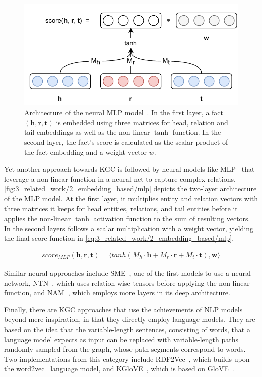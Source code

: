 \begin{figure}[t]
    \centering
    \includegraphics{3_related_work/2_embedding_based/mlp}
    \caption{Architecture of the neural MLP model~\cite{Dong2014KnowledgeVA}. In the first layer, a fact $(\textbf{h}, \textbf{r}, \textbf{t})$ is embedded using three matrices for head, relation and tail embeddings as well as the non-linear $\tanh$ function. In the second layer, the fact's score is calculated as the scalar product of the fact embedding and a weight vector $w$.}
    \label{fig:3_related_work/2_embedding_based/mlp}
\end{figure}

Yet another approach towards KGC is followed by neural models like MLP~\cite{Dong2014KnowledgeVA} that leverage a non-linear function in a neural net to capture complex relations. \autoref{fig:3_related_work/2_embedding_based/mlp} depicts the two-layer architecture of the MLP model. At the first layer, it multiplies entity and relation vectors with three matrices it keeps for head entities, relations, and tail entities before it applies the non-linear $\tanh$ activation function to the sum of resulting vectors. In the second layers follows a scalar multiplication with a weight vector, yielding the final score function in \autoref{eq:3_related_work/2_embedding_based/mlp}.

\begin{align}
    score_{MLP}(\textbf{h}, \textbf{r}, \textbf{t}) = \langle tanh(M_h \cdot \textbf{h} + M_r \cdot \textbf{r} + M_t \cdot \textbf{t}), \textbf{w} \rangle
    \label{eq:3_related_work/2_embedding_based/mlp}
\end{align}

Similar neural approaches include SME~\cite{Glorot2013ASM}, one of the first models to use a neural network, NTN~\cite{Socher2013ReasoningWN}, which uses relation-wise tensors before applying the non-linear function, and NAM~\cite{LIU2016ProbabilisticRV}, which employs more layers in its deep architecture.

Finally, there are KGC approaches that use the achievements of NLP models beyond mere inspiration, in that they directly employ language models. They are based on the idea that the variable-length sentences, consisting of words, that a language model expects as input can be replaced with variable-length paths randomly sampled from the graph, whose path segments correspond to words. Two implementations from this category include RDF2Vec~\cite{Ristoski2016RDF2VecRG}, which builds upon the word2vec~\cite{Mikolov2013EfficientEO} language model, and KGloVE~\cite{Cochez2017GlobalRV}, which is based on GloVE~\cite{Pennington2014GloveGV}.
